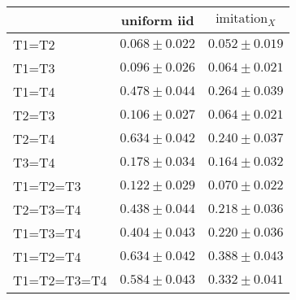 \begin{tabular}{lcc}
\toprule
 & uniform iid & $\text{imitation}_X$ \\
\midrule
T1=T2 & $0.068 \pm 0.022$ & $0.052 \pm 0.019$ \\
T1=T3 & $0.096 \pm 0.026$ & $0.064 \pm 0.021$ \\
T1=T4 & $0.478 \pm 0.044$ & $0.264 \pm 0.039$ \\
T2=T3 & $0.106 \pm 0.027$ & $0.064 \pm 0.021$ \\
T2=T4 & $0.634 \pm 0.042$ & $0.240 \pm 0.037$ \\
T3=T4 & $0.178 \pm 0.034$ & $0.164 \pm 0.032$ \\
T1=T2=T3 & $0.122 \pm 0.029$ & $0.070 \pm 0.022$ \\
T2=T3=T4 & $0.438 \pm 0.044$ & $0.218 \pm 0.036$ \\
T1=T3=T4 & $0.404 \pm 0.043$ & $0.220 \pm 0.036$ \\
T1=T2=T4 & $0.634 \pm 0.042$ & $0.388 \pm 0.043$ \\
T1=T2=T3=T4 & $0.584 \pm 0.043$ & $0.332 \pm 0.041$ \\
\bottomrule
\end{tabular}
